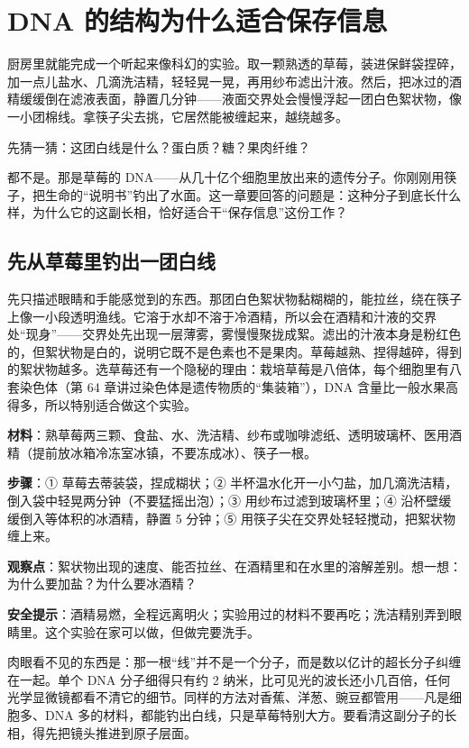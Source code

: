 \chapter{DNA 的结构为什么适合保存信息}

\begin{kaichang}
厨房里就能完成一个听起来像科幻的实验。取一颗熟透的草莓，装进保鲜袋捏碎，加一点儿盐水、几滴洗洁精，轻轻晃一晃，再用纱布滤出汁液。然后，把冰过的酒精缓缓倒在滤液表面，静置几分钟——液面交界处会慢慢浮起一团白色絮状物，像一小团棉线。拿筷子尖去挑，它居然能被缠起来，越绕越多。

先猜一猜：这团白线是什么？蛋白质？糖？果肉纤维？

都不是。那是草莓的 DNA——从几十亿个细胞里放出来的遗传分子。你刚刚用筷子，把生命的“说明书”钓出了水面。这一章要回答的问题是：这种分子到底长什么样，为什么它的这副长相，恰好适合干“保存信息”这份工作？
\end{kaichang}

\section{先从草莓里钓出一团白线}

先只描述眼睛和手能感觉到的东西。那团白色絮状物黏糊糊的，能拉丝，绕在筷子上像一小段透明渔线。它溶于水却不溶于冷酒精，所以会在酒精和汁液的交界处“现身”——交界处先出现一层薄雾，雾慢慢聚拢成絮。滤出的汁液本身是粉红色的，但絮状物是白的，说明它既不是色素也不是果肉。草莓越熟、捏得越碎，得到的絮状物越多。选草莓还有一个隐秘的理由：栽培草莓是八倍体，每个细胞里有八套染色体（第 64 章讲过染色体是遗传物质的“集装箱”），DNA 含量比一般水果高得多，所以特别适合做这个实验。

\begin{shiyan}
\textbf{材料}：熟草莓两三颗、食盐、水、洗洁精、纱布或咖啡滤纸、透明玻璃杯、医用酒精（提前放冰箱冷冻室冰镇，不要冻成冰）、筷子一根。

\textbf{步骤}：① 草莓去蒂装袋，捏成糊状；② 半杯温水化开一小勺盐，加几滴洗洁精，倒入袋中轻晃两分钟（不要猛摇出泡）；③ 用纱布过滤到玻璃杯里；④ 沿杯壁缓缓倒入等体积的冰酒精，静置 5 分钟；⑤ 用筷子尖在交界处轻轻搅动，把絮状物缠上来。

\textbf{观察点}：絮状物出现的速度、能否拉丝、在酒精里和在水里的溶解差别。想一想：为什么要加盐？为什么要冰酒精？

\textbf{安全提示}：酒精易燃，全程远离明火；实验用过的材料不要再吃；洗洁精别弄到眼睛里。这个实验在家可以做，但做完要洗手。
\end{shiyan}

肉眼看不见的东西是：那一根“线”并不是一个分子，而是数以亿计的超长分子纠缠在一起。单个 DNA 分子细得只有约 2 纳米，比可见光的波长还小几百倍，任何光学显微镜都看不清它的细节。同样的方法对香蕉、洋葱、豌豆都管用——凡是细胞多、DNA 多的材料，都能钓出白线，只是草莓特别大方。要看清这副分子的长相，得先把镜头推进到原子层面。

